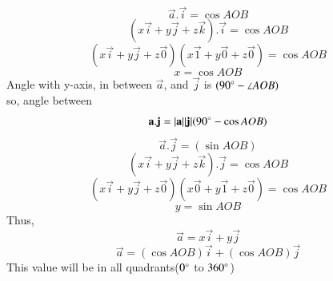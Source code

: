 \documentclass[journal,12pt,twocolumn]{IEEEtran}
\begin{document}
\begin{equation}
    \vec{a}.\vec{i} = \cos{AOB}
\end{equation}
%
\begin{equation}
 (x\vec{i}+y\vec{j}+z\vec{k}).\vec{i} = \cos{AOB} 
\end{equation}
%
\begin{equation}
 (x\vec{i}+y\vec{j}+z\vec{0})(x\vec{1}+y\vec{0}+z\vec{0}) = \cos{AOB} 
\end{equation}
%
\begin{equation}
x= \cos{AOB}
\end{equation}
%
Angle with y-axis, in between $\vec{a}$,  and  $\vec{j}$  is $(90\degree - \angle{AOB})$\\
%
so, angle between \\
%
\begin{equation}
\mathbf{a}.\mathbf{j} = |\mathbf{a}| |\mathbf{j}| (90\degree -\cos{AOB})
\end{equation}
%
\begin{equation}
\vec{a}.\vec{j} = (\sin{AOB})
\end{equation}
%
\begin{equation}
 (x\vec{i}+y\vec{j}+z\vec{k}).\vec{j} = \cos{AOB} 
\end{equation}
%
\begin{equation}
 (x\vec{i}+y\vec{j}+z\vec{0})(x\vec{0}+y\vec{1}+z\vec{0}) = \cos{AOB} 
\end{equation}
%
\begin{equation}
y= \sin{AOB}
\end{equation}
%
Thus,
%
\begin{equation}
\vec{a} = x\vec{i}+y\vec{j}
\end{equation}
%
\begin{equation}
\vec{a} = (\cos{AOB})\vec{i}+(\cos{AOB}) \vec{j}
\end{equation}
%
This value will be in all quadrants($0\degree$ to $360\degree$)
\\
\end{document}
